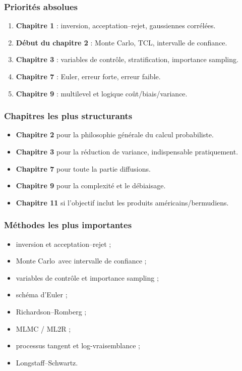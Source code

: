 \documentclass[11pt,a4paper]{article}
\newcommand{\mc}{Monte Carlo}
\begin{document}
\subsubsection*{Priorités absolues}

\begin{enumerate}
  \item \textbf{Chapitre 1} : inversion, acceptation--rejet, gaussiennes corrélées.
  \item \textbf{Début du chapitre 2} : \mc, TCL, intervalle de confiance.
  \item \textbf{Chapitre 3} : variables de contrôle, stratification, importance sampling.
  \item \textbf{Chapitre 7} : Euler, erreur forte, erreur faible.
  \item \textbf{Chapitre 9} : multilevel et logique coût/biais/variance.
\end{enumerate}

\subsubsection*{Chapitres les plus structurants}

\begin{itemize}
  \item \textbf{Chapitre 2} pour la philosophie générale du calcul probabiliste.
  \item \textbf{Chapitre 3} pour la réduction de variance, indispensable pratiquement.
  \item \textbf{Chapitre 7} pour toute la partie diffusions.
  \item \textbf{Chapitre 9} pour la complexité et le débiaisage.
  \item \textbf{Chapitre 11} si l'objectif inclut les produits américains/bermudiens.
\end{itemize}

\subsubsection*{Méthodes les plus importantes}

\begin{itemize}
  \item inversion et acceptation--rejet ;
  \item \mc\ avec intervalle de confiance ;
  \item variables de contrôle et importance sampling ;
  \item schéma d'Euler ;
  \item Richardson--Romberg ;
  \item MLMC / ML2R ;
  \item processus tangent et log-vraisemblance ;
  \item Longstaff--Schwartz.
\end{itemize}
\end{document}
